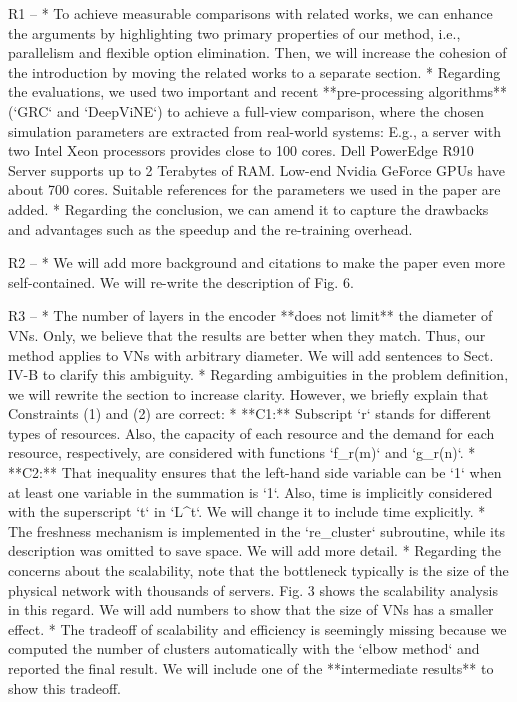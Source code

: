 R1
--
* To achieve measurable comparisons with related works, we can enhance the arguments by highlighting two primary properties of our method, i.e., parallelism and flexible option elimination. Then, we will increase the cohesion of the introduction by moving the related works to a separate section. 
* Regarding the evaluations, we used two important and recent **pre-processing algorithms** (`GRC` and `DeepViNE`) to achieve a full-view comparison, where the chosen simulation parameters are extracted from real-world systems: E.g., a server with two Intel Xeon processors provides close to 100 cores. Dell PowerEdge R910 Server supports up to 2 Terabytes of RAM. Low-end Nvidia GeForce GPUs have about 700 cores. Suitable references for the parameters we used in the paper are added.
* Regarding the conclusion, we can amend it to capture the drawbacks and advantages such as the speedup and the re-training overhead.

R2
--
* We will add more background and citations to make the paper even more self-contained. We will re-write the description of Fig. 6. 

R3
--
* The number of layers in the encoder **does not limit** the diameter of VNs. Only, we believe that the results are better when they match. Thus,  our method applies to VNs with arbitrary diameter. We will add sentences to Sect. IV-B to clarify this ambiguity.
* Regarding ambiguities in the problem definition, we will rewrite the section to increase clarity. However, we briefly explain that Constraints (1) and (2) are correct:
  * **C1:** Subscript `r` stands for different types of resources. Also, the capacity of each resource and the demand for each resource, respectively, are considered with functions `f_r(m)` and `g_r(n)`. 
  * **C2:** That inequality ensures that the left-hand side variable can be `1` when at least one variable in the summation is `1`. Also, time is implicitly considered with the superscript `t` in `L^t`. We will change it to include time explicitly.
* The freshness mechanism is implemented in the `re_cluster` subroutine, while its description was omitted to save space. We will add more detail.
* Regarding the concerns about the scalability, note that the bottleneck typically is the size of the physical network with thousands of servers. Fig. 3 shows the scalability analysis in this regard. We will add numbers to show that the size of VNs has a smaller effect.
* The tradeoff of scalability and efficiency is seemingly missing because we computed the number of clusters automatically with the `elbow method` and reported the final result. We will include one of the **intermediate results** to show this tradeoff. 

